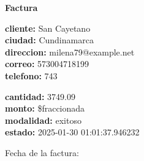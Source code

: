 \documentclass{article}
\begin{document}
\begin{center}
    {\LARGE \textbf{Factura}}\\[1cm]
\end{center}

\textbf{cliente:} San Cayetano \\
\textbf{ciudad:} Cundinamarca \\
\textbf{direccion:} milena79@example.net \\
\textbf{correo:} 573004718199 \\
\textbf{telefono:} 743 \\

\vspace{0.5cm}

\textbf{cantidad:} 3749.09 \\
\textbf{monto:} \$fraccionada \\
\textbf{modalidad:} exitoso \\
\textbf{estado:} 2025-01-30 01:01:37.946232 \\

\vspace{1cm}

Fecha de la factura: 
\end{document}

